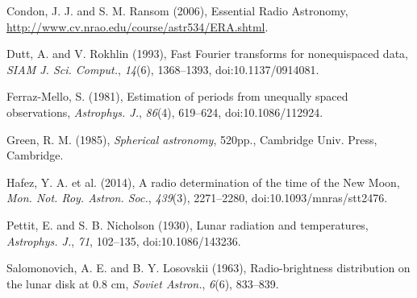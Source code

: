 \documentclass[10pt]{article}
\begin{document}
\hangindent 0.25in Condon, J. J. and S. M. Ransom (2006), Essential Radio Astronomy, \\
\href{http://www.cv.nrao.edu/course/astr534/ERA.shtml}
{http://www.cv.nrao.edu/course/astr534/ERA.shtml}.

\hangindent 0.25in Dutt, A. and V. Rokhlin (1993), Fast Fourier transforms for
nonequispaced data, \textit{SIAM J. Sci. Comput.}, \textit{14}(6),
1368--1393, doi:10.1137/0914081.

\hangindent 0.25in Ferraz-Mello, S. (1981), Estimation of periods from
unequally spaced observations, \textit{Astrophys. J.}, \textit{86}(4),
619--624, doi:10.1086/112924.

\hangindent 0.25in Green, R. M. (1985), \textit{Spherical astronomy}, 520pp.,
Cambridge Univ. Press, Cambridge.

\hangindent 0.25in Hafez, Y. A. et al. (2014), A radio determination of the time of the New Moon, \textit{Mon. Not. Roy. Astron. Soc.}, \textit{439}(3), 2271--2280, doi:10.1093/mnras/stt2476.

\hangindent 0.25in Pettit, E. and S. B. Nicholson (1930), Lunar radiation and temperatures, \textit{Astrophys. J.}, \textit{71}, 102--135, doi:10.1086/143236.

\hangindent 0.25in Salomonovich, A. E. and B. Y. Losovskii (1963), Radio-brightness distribution on the lunar disk at 0.8 cm, \textit{Soviet Astron.}, \textit{6}(6), 833--839.
\end{document}
